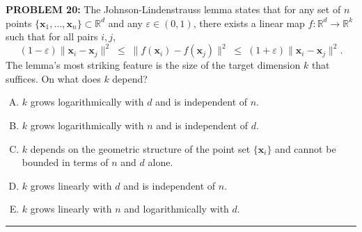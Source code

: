 \documentclass[12pt]{amsart}
\newcommand{\divider}{
  \vspace{-1em} %
  \noindent
  \raisebox{-0.15ex}{\textbullet}%
  \hspace{0.5em}%
  \rule[0.5ex]{0.95\textwidth}{1.0pt}%
  \hspace{0.5em}%
  \raisebox{-0.15ex}{\textbullet}%
  \vspace{0em} %
}
\begin{document}
{\bf PROBLEM 20:}
The Johnson-Lindenstrauss lemma states that for any set of $n$ points $\{\mathbf{x}_1, \ldots, 
\mathbf{x}_n\} \subset \mathbb{R}^d$ and any $\varepsilon \in (0, 1)$, there exists a linear 
map $f : \mathbb{R}^d \to \mathbb{R}^k$ such that for all pairs $i, j$,
$$(1-\varepsilon)\|\mathbf{x}_i - \mathbf{x}_j\|^2 \;\leq\; \|f(\mathbf{x}_i) - f(\mathbf{x}_j)\|^2 \;\leq\; (1+\varepsilon)\|\mathbf{x}_i - \mathbf{x}_j\|^2.$$
The lemma's most striking feature is the size of the target dimension $k$ that suffices.
On what does $k$ depend?
\begin{enumerate}[(A)]
\item $k$ grows logarithmically with $d$ and is independent of $n$.
\item $k$ grows logarithmically with $n$ and is independent of $d$.
\item $k$ depends on the geometric structure of the point set $\{\mathbf{x}_i\}$ and cannot 
be bounded in terms of $n$ and $d$ alone.
\item $k$ grows linearly with $d$ and is independent of $n$.
\item $k$ grows linearly with $n$ and logarithmically with $d$.
\end{enumerate}
%
\divider
\end{document}
